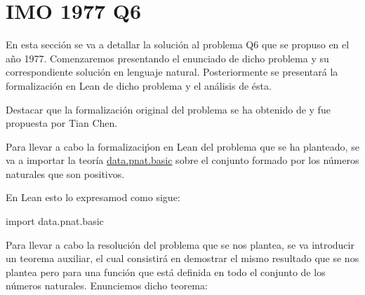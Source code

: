 
\section{IMO 1977 Q6}

En esta sección se va a detallar la solución al problema Q6 que se
propuso en el año 1977. Comenzaremos presentando el enunciado de dicho
problema y su correspondiente solución en lenguaje
natural. Posteriormente se presentará la formalización en Lean de dicho
problema y el análisis de ésta.

Destacar que la formalización original del problema se ha obtenido de
\cite{TC} y fue propuesta por Tian Chen.

\noindent
{}

Para llevar a cabo la formalizaciṕon en Lean del problema que
se ha planteado, se va a importar la teoría
\href{https://github.com/leanprover-community/mathlib/blob/
  master/src/data/pnat/basic.lean}{data.pnat.basic} sobre el conjunto
formado por los números naturales que son positivos.

En Lean esto lo expresamod como sigue:
\begin{leancode}
import data.pnat.basic
\end{leancode}

Para llevar a cabo la resolución del problema que se nos plantea,
se va introducir un teorema auxiliar, el cual consistirá en
demostrar el mismo resultado que se nos plantea pero para una
función que está definida en todo el conjunto de los números
naturales. Enunciemos dicho teorema:

